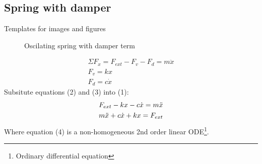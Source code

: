 \documentclass[11pt, a4paper]{article}
\begin{document}
\subsection{Spring with damper}
\setcounter{equation}{0}
Templates for images and figures
\begin{figure}[h]
  \centering
  \qquad
  \caption{Oscilating spring with damper term}
\end{figure}
\begin{gather}
  \Sigma F_x = F_{ext} - F_v - F_d = m\ddot{x}\\
  F_v = kx\\
  F_d = c\dot{x}
\end{gather}
Subsitute equations (2) and (3) into (1):
\begin{gather}
  F_{ext} - kx - c\dot{x} = m\ddot{x} \notag \\
  m\ddot{x} + c\dot{x} + kx = F_{ext}
\end{gather}
Where equation (4) is a non-homogeneous 2nd order linear ODE\footnote{Ordinary differential equation}.
\end{document}
